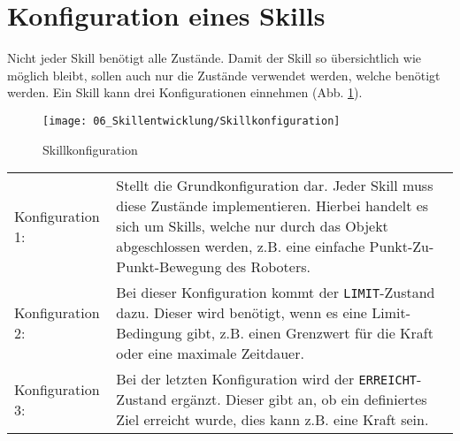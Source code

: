 \section{Konfiguration eines Skills} \label{Skillkonfiguration}
	Nicht jeder Skill benötigt alle Zustände. Damit der Skill so übersichtlich wie möglich bleibt, sollen auch nur die Zustände verwendet werden, welche benötigt werden. Ein Skill kann drei Konfigurationen einnehmen (Abb. \ref{fig:Skillkonfiguration}).
	\\
	\begin{figure}[h!]
		\centering
		\texttt{[image: 06\_Skillentwicklung/Skillkonfiguration]}
		\captionsetup{justification=centering}
		\caption{Skillkonfiguration}
		\label{fig:Skillkonfiguration}
	\end{figure}
	
	\begin{tabularx}{\textwidth}{@{}>{}p{8em} X@{}}
		Konfiguration 1: & 
		Stellt die Grundkonfiguration dar. Jeder Skill muss diese Zustände implementieren. Hierbei handelt es sich um Skills, welche nur durch das Objekt abgeschlossen werden, z.B. eine einfache Punkt-Zu-Punkt-Bewegung des Roboters.
		\\
		Konfiguration 2: & 
		Bei dieser Konfiguration kommt der \verb|LIMIT|-Zustand dazu. Dieser wird benötigt, wenn es eine Limit-Bedingung gibt, z.B. einen Grenzwert für die Kraft oder eine maximale Zeitdauer.
		\\
		Konfiguration 3: & 
		Bei der letzten Konfiguration wird der \verb|ERREICHT|-Zustand ergänzt. Dieser gibt an, ob ein definiertes Ziel erreicht wurde, dies kann z.B. eine Kraft sein.
		\\
	\end{tabularx}